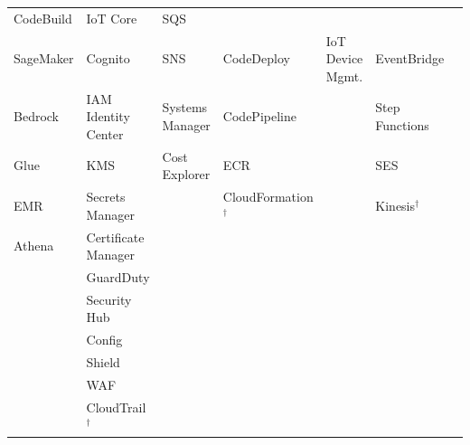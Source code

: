\begin{table}[htbp]
{\begin{tabularx}{1.62\linewidth}{XXXXXXX}
CodeBuild                   & IoT Core                   & SQS                      & \\
SageMaker                   & Cognito                    & SNS                      &
CodeDeploy                  & IoT Device Mgmt.           & EventBridge              & \\
Bedrock                     & IAM Identity Center        & Systems Manager          &
CodePipeline                &                            & Step Functions           & \\
Glue                        & KMS                        & Cost Explorer            &
ECR                         &                            & SES                      & \\
EMR                         & Secrets Manager            &                          &
CloudFormation$^{\dagger}$  &                            & Kinesis$^{\dagger}$      & \\
Athena                      & Certificate Manager        &                          &
                            &                            &                          & \\
                            & GuardDuty                  &                          &
                            &                            &                          & \\
                            & Security Hub               &                          &
                            &                            &                          & \\
                            & Config                     &                          &
                            &                            &                          & \\
                            & Shield                     &                          &
                            &                            &                          & \\
                            & WAF                        &                          &
                            &                            &                          & \\
                            & CloudTrail$^{\dagger}$     &                          &
                            &                            &                          & \\
\bottomrule
\end{tabularx}
}
\end{table}

